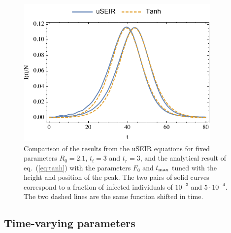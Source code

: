\documentclass[a4paper,oneside,11pt]{article}
\begin{document}
\begin{figure}[h!]
  \centering
  \includegraphics[width=10cm]{logistica.pdf}  
  \caption{Comparison of the results from the uSEIR equations for fixed parameters $R_0=2.1$, $t_i=3$ and $t_r=3$, and the analytical result of  eq.~(\ref{eq:tanh}) with the parameters $F_0$ and $t_{\rm max}$ tuned with the height and position of the peak. The two pairs of solid curves correspond to a fraction of infected individuals of $10^{-3}$ and $5\cdot 10^{-4}$. The two dashed lines are the same function shifted in time.}
  \label{fig:dispersion}
   \end{figure}  
 \subsection{Time-varying parameters}
 
\end{document}
